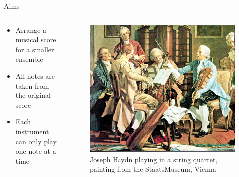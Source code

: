 \documentclass[handout]{beamer}
\begin{document}
\begin{frame}{Aims}

    \begin{columns}
        \begin{column}{.6\textwidth}
            \begin{itemize}[<+(1)->]
                \item Arrange a musical score for a smaller ensemble
                \item All notes are taken from the original score
                \item Each instrument can only play one note at a time
            \end{itemize}
        \end{column}
        \begin{column}{.4\textwidth}
            \begin{figure}
                \includegraphics[width=\textwidth]{string-quartet.jpg}
                \caption{Joseph Haydn playing in a string quartet,\\painting from the StaatsMuseum, Vienna}
            \end{figure}
        \end{column}
    \end{columns}

\end{frame}
\end{document}

